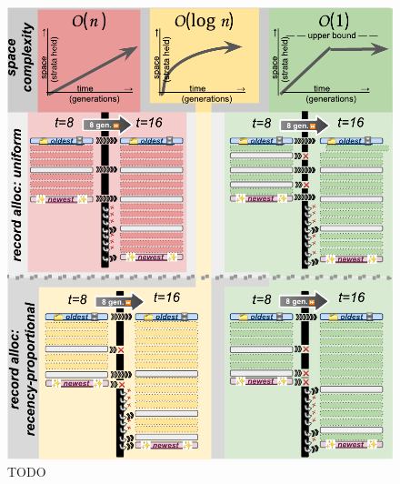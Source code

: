 \begin{figure}
  \centering
  \includegraphics[width=\textwidth]{img/retention-policy-matrix}
  \caption{
    TODO
  }
  \label{fig:retention-policy-matrix}
\end{figure}
